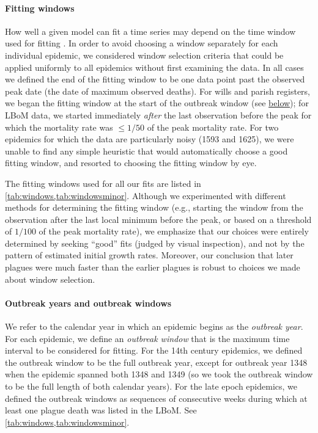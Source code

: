 \paragraph{Fitting windows}

How well a given model can fit a time series may depend on the time window used for fitting \cite{ChamEarn16}.  In order to avoid choosing a window separately for each individual epidemic, we considered window selection criteria that could be applied uniformly to all epidemics without first examining the data. In all cases we defined the end of the fitting window to be one data point past the observed peak date (the date of maximum observed deaths).  For wills and parish registers, we began the fitting window at the start of the outbreak window (see \hyperlink{outbreak.year}{below}); for LBoM data, we started immediately \emph{after} the last observation before the peak for which the mortality rate was $\le 1/50$ of the peak mortality rate. For two epidemics for which the data are particularly noisy (1593 and 1625), we were unable to find any simple heuristic that would automatically choose a good fitting window, and resorted to choosing the fitting window by eye.

The fitting windows used for all our fits are listed in \supp \cref{tab:windows,tab:windowsminor}. Although we experimented with different methods for determining the fitting window (e.g., starting the window from the observation after the last local minimum before the peak, or based on a threshold of $1/100$ of the peak mortality rate), we emphasize that our choices were entirely determined by seeking ``good'' fits (judged by visual inspection), and not by the pattern of estimated initial growth rates. Moreover, our conclusion that later plagues were much faster than the earlier plagues is robust to choices we made about window selection.

\hypertarget{outbreak.year}{}
\paragraph{Outbreak years and outbreak windows}

We refer to the calendar year in which an epidemic begins as the \emph{outbreak year}.  For each epidemic, we define an \emph{outbreak window} that is the maximum time interval to be considered for fitting.  For the 14th century epidemics, we defined the outbreak window to be the full outbreak year, except for outbreak year 1348 when the epidemic spanned both 1348 and 1349 (so we took the outbreak window to be the full length of both calendar years).  For the late epoch epidemics, we defined the outbreak windows as sequences of consecutive weeks during which at least one plague death was listed in the LBoM.  See \supp \cref{tab:windows,tab:windowsminor}.

